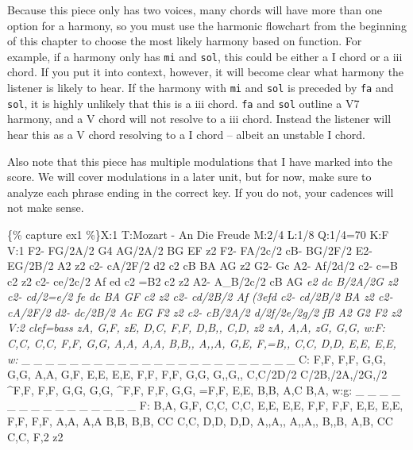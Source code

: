 \documentclass{book}
\begin{document}
Because this piece only has two voices, many chords will have more than one
option for a harmony, so you must use the harmonic flowchart from the
beginning of this chapter to choose the most likely harmony based on function.
For example, if a harmony only has \texttt{mi} and \texttt{sol}, this could be
either a I chord or a iii chord. If you put it into context, however, it will
become clear what harmony the listener is likely to hear. If the harmony with
\texttt{mi} and \texttt{sol} is preceded by \texttt{fa} and \texttt{sol}, it
is highly unlikely that this is a iii chord. \texttt{fa} and \texttt{sol}
outline a V7 harmony, and a V chord will not resolve to a iii chord. Instead
the listener will hear this as a V chord resolving to a I chord -- albeit an
unstable I chord.

Also note that this piece has multiple modulations that I have marked into the
score. We will cover modulations in a later unit, but for now, make sure to
analyze each phrase ending in the correct key. If you do not, your cadences
will not make sense.

\{\% capture ex1 \%\}X:1 T:Mozart - An Die Freude M:2/4 L:1/8 Q:1/4=70 K:F V:1
F2- FG/2A/2\textbar{} G4\textbar{} AG/2A/2 BG\textbar{} EF z2\textbar{} F2-
FA/2c/2\textbar{} cB- BG/2F/2\textbar{} E2- EG/2B/2\textbar{} A2 z2\textbar{}
c2- cA/2F/2\textbar{} d2 c2\textbar{} cB BA\textbar{} AG z2\textbar{} G2-
Gc\textbar{} A2- Af/2d/2\textbar{} c2- c=B\textbar{} c2 z2\textbar{} c2-
ce/2c/2\textbar{} Af ed\textbar{} c2 =B2\textbar{} c2 z2\textbar{} A2-
A\_B/2c/2\textbar{} cB AG\textbar{} \emph{e2 dc\textbar{} B/2A/2G z2\textbar{}
c2- cd/2=e/2\textbar{} fe dc\textbar{} BA GF\textbar{} c2 z2\textbar{} c2-
cd/2B/2\textbar{} Af (3efd\textbar{} c2- cd/2B/2\textbar{} BA z2\textbar{} c2-
cA/2F/2\textbar{} d2- dc/2B/2\textbar{} Ac EG\textbar{} F2 z2\textbar{} c2-
cB/2A/2\textbar{} d/2f/2e/2g/2 fB\textbar{} A2 G2\textbar{} F2 z2\textbar{]}
V:2 clef=bass zA, G,F,\textbar{} zE, D,C,\textbar{} F,F, D,B,,\textbar{} C,D,
z2\textbar{} zA, A,A,\textbar{} zG, G,G,\textbar{} w:F: C,C, C,C,\textbar{}
F,F, G,G,\textbar{} A,A, A,A,\textbar{} B,B,, A,,A,\textbar{} G,E,
F,=B,,\textbar{} C,C, D,D,\textbar{} E,E, E,E,\textbar{} w:} \_ \_ \_ \_ \_ \_
\_ \_ \_ \_ \_ \_ \_ \_ \_ \_ \_ \_ \_ \_ \_ \_ \_ C: F,F, F,F,\textbar{} G,G,
G,G,\textbar{} A,A, G,F,\textbar{} E,E, E,E,\textbar{} F,F, F,F,\textbar{}
G,G, G,,G,,\textbar{} C,C/2D/2 C/2B,/2A,/2G,/2\textbar{} \^{}F,F,
F,F,\textbar{} G,G, G,G,\textbar{} \^{}F,F, F,F,\textbar{} G,G,
=F,F,\textbar{} E,E, B,B,\textbar{} A,C B,A,\textbar{} w:g: \_ \_ \_ \_ \_ \_
\_ \_ \_ \_ \_ \_ \_ \_ \_ F: B,A, G,F,\textbar{} C,C, C,C,\textbar{} E,E,
E,E,\textbar{} F,F, F,F,\textbar{} E,E, E,E,\textbar{} F,F, F,F,\textbar{}
A,A, A,A\textbar{} B,B, B,B,\textbar{} CC C,C,\textbar{} D,D, D,D,\textbar{}
A,,A,, A,,A,,\textbar{} B,,B, A,B,\textbar{} CC C,C,\textbar{} F,2
z2\textbar{]}
\end{document}
